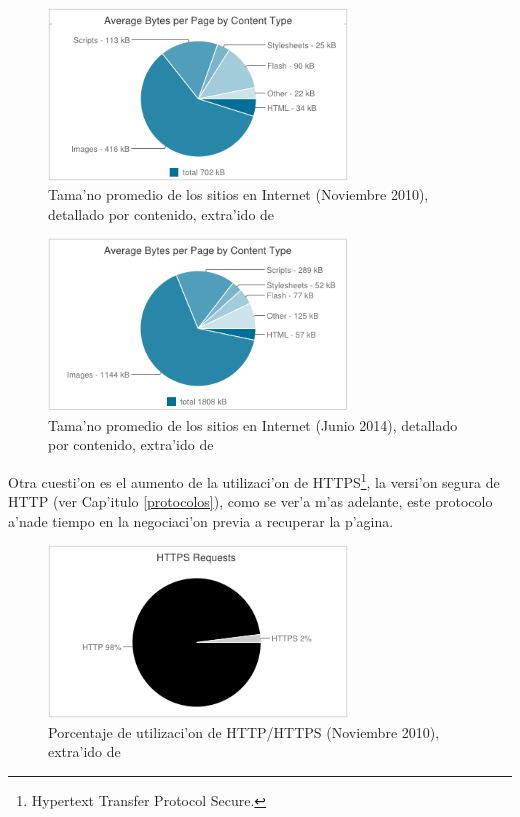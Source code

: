 \begin{figure}[h]
  	\centering
	\includegraphics[width=300px]{img/grafSitios2010}
	\caption{\small Tama'no promedio de los sitios en Internet (Noviembre 2010), detallado por contenido, extra'ido de \cite{httparchive}}
	\label{grafSitios2010}
\end{figure}

\begin{figure}[h]
  	\centering
	\includegraphics[width=300px]{img/grafSitios2014}
	\caption{\small Tama'no promedio de los sitios en Internet (Junio 2014), detallado por contenido, extra'ido de \cite{httparchive}}
	\label{grafSitios2014}
\end{figure}

Otra cuesti'on es el aumento de la utilizaci'on de HTTPS\footnote{Hypertext Transfer Protocol Secure.}, la versi'on segura de HTTP (ver Cap'itulo \ref{protocolos}), como se ver'a m'as adelante, este protocolo a'nade tiempo en la negociaci'on previa a recuperar la p'agina.

\begin{figure}[h]
  	\centering
	\includegraphics[width=300px]{img/httphttps2010}
	\caption{\small Porcentaje de utilizaci'on de HTTP/HTTPS (Noviembre 2010), extra'ido de \cite{httparchive}}
	\label{httphttps2010}
\end{figure}


